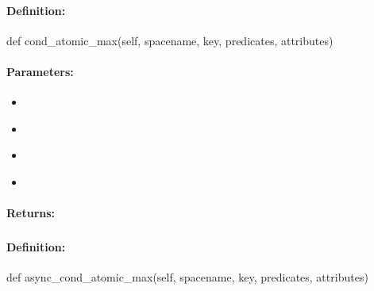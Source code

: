 \paragraph{Definition:}
\begin{pythoncode}
def cond_atomic_max(self, spacename, key, predicates, attributes)
\end{pythoncode}

\paragraph{Parameters:}
\begin{itemize}[noitemsep]
\item {}\\

\item {}\\

\item {}\\

\item {}\\

\end{itemize}

\paragraph{Returns:}


\pagebreak
\subsubsection{}
\label{api:python:async_cond_atomic_max}


\paragraph{Definition:}
\begin{pythoncode}
def async_cond_atomic_max(self, spacename, key, predicates, attributes)
\end{pythoncode}


